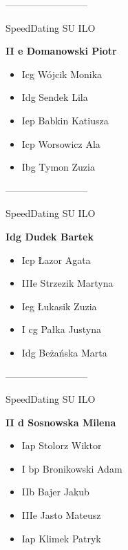 \documentclass[a4paper,10pt]{article}
\begin{document}
\begin{multicols}{3}
\begin{minipage}[l]{\textwidth}
\begin{itemize}
    \end{itemize}



\end{minipage}



\begin{minipage}[l]{\textwidth}
--------------------------

  \footnotesize{SpeedDating SU ILO}

  \bfseries{II e Domanowski Piotr}

  \begin{itemize}
    \item Icg Wójcik Monika
    \item Idg Sendek Lila
    \item Iep Babkin Katiusza
    \item Icp Worsowicz Ala
    \item Ibg Tymon Zuzia

    \end{itemize}



\end{minipage}



\begin{minipage}[l]{\textwidth}
--------------------------

  \footnotesize{SpeedDating SU ILO}

  \bfseries{Idg Dudek Bartek}

  \begin{itemize}
    \item Icp Łazor Agata
    \item IIIe Strzezik Martyna
    \item Ieg Łukasik Zuzia
    \item I cg Pałka Justyna
    \item Idg Beżańska Marta

    \end{itemize}



\end{minipage}



\begin{minipage}[l]{\textwidth}
--------------------------

  \footnotesize{SpeedDating SU ILO}

  \bfseries{II d Sosnowska Milena}

  \begin{itemize}
    \item Iap Stolorz Wiktor
    \item I bp Bronikowski Adam
    \item IIb Bajer Jakub
    \item IIIe Jasto Mateusz
    \item Iap Klimek Patryk


\end{itemize}
\end{minipage}
\end{multicols}
\end{document}
